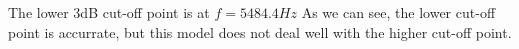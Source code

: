 %
%
%
%
%

The lower 3dB cut-off point is at $f=5484.4 Hz$
As we can see, the lower cut-off point is accurrate, but this model does not deal well with the higher cut-off point.
